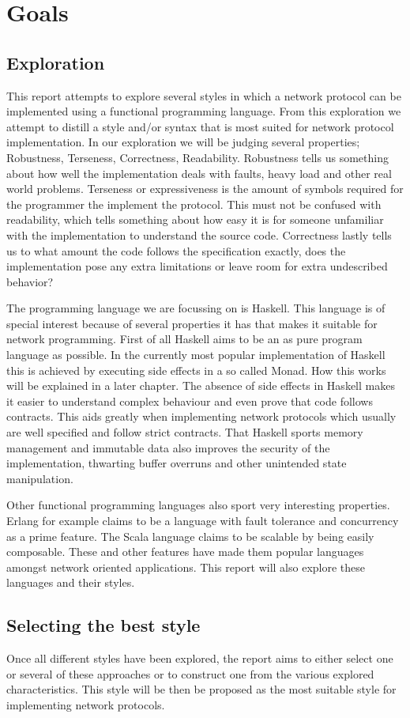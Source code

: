 \chapter{Goals}
\section{Exploration}
This report attempts to explore several styles in which a network protocol can be implemented using a functional programming language. From this exploration we attempt to distill a style and/or syntax that is most suited for network protocol implementation. In our exploration we will be judging several properties; Robustness, Terseness, Correctness, Readability. Robustness tells us something about how well the implementation deals with faults, heavy load and other real world problems. Terseness or expressiveness is the amount of symbols required for the programmer the implement the protocol. This must not be confused with readability, which tells something about how easy it is for someone unfamiliar with the implementation to understand the source code. Correctness lastly tells us to what amount the code follows the specification exactly, does the implementation pose any extra limitations or leave room for extra undescribed behavior?

The programming language we are focussing on is Haskell. This language is of special interest because of several properties it has that makes it suitable for network programming. First of all Haskell aims to be an as pure program language as possible. In the currently most popular implementation of Haskell this is achieved by executing side effects in a so called Monad. How this works will be explained in a later chapter. The absence of side effects in Haskell makes it easier to understand complex behaviour and even prove that code follows contracts. This aids greatly when implementing network protocols which usually are well specified and follow strict contracts. That Haskell sports memory management and immutable data also improves the security of the implementation, thwarting buffer overruns and other unintended state manipulation.

Other functional programming languages also sport very interesting properties. Erlang for example claims to be a language with fault tolerance and concurrency as a prime feature. The Scala language claims to be scalable by being easily composable. These and other features have made them popular languages amongst network oriented applications. This report will also explore these languages and their styles.

\section{Selecting the best style}
Once all different styles have been explored, the report aims to either select one or several of these approaches or to construct one from the various explored characteristics. This style will be then be proposed as the most suitable style for implementing network protocols.
